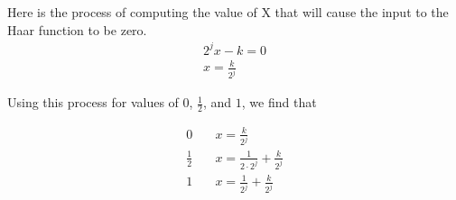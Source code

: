 \documentclass[12pt]{amsart}
\begin{document}
Here is the process of computing the value of X that will cause the input to
the Haar function to be zero.
\begin{align}
  2^jx-k=0\\
  x=\frac{k}{2^j}
\end{align}

Using this process for values of $0$, $\frac{1}{2}$, and $1$, we find that

\begin{align}
  0\quad&x=\frac{k}{2^j}\\
  \frac{1}{2}\quad&x=\frac{1}{2\cdot2^j}+\frac{k}{2^j}\\
  1\quad&x=\frac{1}{2^j}+\frac{k}{2^j}
\end{align}
\end{document}
